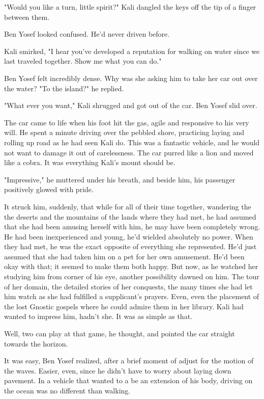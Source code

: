 \documentclass{amsart}
\begin{document}
"Would you like a turn, little spirit?" Kali dangled the keys off the tip of a finger between them. 

Ben Yosef looked confused. He'd never driven before. 

Kali smirked, "I hear you've developed a reputation for walking on water since we last traveled together. Show me what you can do." 

Ben Yosef felt incredibly dense. Why was she asking him to take her car out over the water? "To the island?" he replied. 

"What ever you want," Kali shrugged and got out of the car. Ben Yosef slid over. 

The car came to life when his foot hit the gas, agile and responsive to his very will. He spent a minute driving over the pebbled shore, practicing laying and rolling up road as he had seen Kali do. This was a fantastic vehicle, and he would not want to damage it out of carelessness. The car purred like a lion and moved like a cobra. It was everything Kali's mount should be.

"Impressive," he muttered under his breath, and beside him, his passenger positively glowed with pride.

It struck him, suddenly, that while for all of their time together, wandering the the deserts and the mountains of the lands where they had met, he had assumed that she had been amusing herself with him, he may have been completely wrong. He had been inexperienced and young, he'd wielded absolutely no power. When they had met, he was the exact opposite of everything she represented. He'd just assumed that she had taken him on a pet for her own amusement. He'd been okay with that; it seemed to make them both happy. But now, as he watched her studying him from corner of his eye, another possibility dawned on him. The tour of her domain, the detailed stories of her conquests, the many times she had let him watch as she had fulfilled a supplicant's prayers. Even, even the placement of the lost Gnostic gospels where he could admire them in her library. Kali had wanted to impress him, hadn't she. It was as simple as that.

Well, two can play at that game, he thought, and pointed the car straight towards the horizon.

It was easy, Ben Yosef realized, after a brief moment of adjust for the motion of the waves. Easier, even, since he didn't have to worry about laying down pavement. In a vehicle that wanted to a be an extension of his body, driving on the ocean was no different than walking. 
\end{document}

